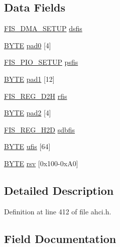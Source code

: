 \subsection*{Data Fields}
\begin{DoxyCompactItemize}
\item 
\hyperlink{ahci_8h_a17830d835a45fe8c22b77d388f517458}{F\+I\+S\+\_\+\+D\+M\+A\+\_\+\+S\+E\+T\+UP} \hyperlink{structtagHBA__FIS_a4a2a84ef5c00d46a159a00185e1255ca}{dsfis}
\item 
\hyperlink{ahci_8h_aae9749d96e15ccb4f482dd5f55d98f9b}{B\+Y\+TE} \hyperlink{structtagHBA__FIS_a5974d07d5e0337acef273602efead34e}{pad0} \mbox{[}4\mbox{]}
\item 
\hyperlink{ahci_8h_ad8fd7185afaad7be85168b284ce91790}{F\+I\+S\+\_\+\+P\+I\+O\+\_\+\+S\+E\+T\+UP} \hyperlink{structtagHBA__FIS_ad27f145a220089dcd16395b8a78c37b3}{psfis}
\item 
\hyperlink{ahci_8h_aae9749d96e15ccb4f482dd5f55d98f9b}{B\+Y\+TE} \hyperlink{structtagHBA__FIS_a01134a3e5ca5f0aeb05d1b087128802c}{pad1} \mbox{[}12\mbox{]}
\item 
\hyperlink{ahci_8h_a391819a2e6a838884ea809330d19c6e3}{F\+I\+S\+\_\+\+R\+E\+G\+\_\+\+D2H} \hyperlink{structtagHBA__FIS_aa67907323182bb417ef30b51616ffe19}{rfis}
\item 
\hyperlink{ahci_8h_aae9749d96e15ccb4f482dd5f55d98f9b}{B\+Y\+TE} \hyperlink{structtagHBA__FIS_ad3bd23dc216101a9fe276a0340f80ca1}{pad2} \mbox{[}4\mbox{]}
\item 
\hyperlink{ahci_8h_a8001e9b5f41caa39166f5aff6613cc3a}{F\+I\+S\+\_\+\+R\+E\+G\+\_\+\+H2D} \hyperlink{structtagHBA__FIS_a983aaa6c08cb81a58f57f4c4ca78e11a}{sdbfis}
\item 
\hyperlink{ahci_8h_aae9749d96e15ccb4f482dd5f55d98f9b}{B\+Y\+TE} \hyperlink{structtagHBA__FIS_a878d317f7fcacf4f24e7dd38567ef0a4}{ufis} \mbox{[}64\mbox{]}
\item 
\hyperlink{ahci_8h_aae9749d96e15ccb4f482dd5f55d98f9b}{B\+Y\+TE} \hyperlink{structtagHBA__FIS_a27c4d8e2aeadeca4c7dab4ff3e962f22}{rsv} \mbox{[}0x100-\/0x\+A0\mbox{]}
\end{DoxyCompactItemize}


\subsection{Detailed Description}


Definition at line 412 of file ahci.\+h.



\subsection{Field Documentation}
